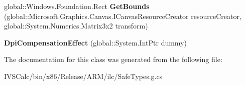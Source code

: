 \begin{DoxyCompactItemize}
\item 
\mbox{\label{class_microsoft_1_1_graphics_1_1_canvas_1_1_effects_1_1_dpi_compensation_effect_affcc94a3d3762f96011af355812faf07}} 
global\+::\+Windows.\+Foundation.\+Rect {\bfseries Get\+Bounds} (global\+::\+Microsoft.\+Graphics.\+Canvas.\+I\+Canvas\+Resource\+Creator resource\+Creator, global\+::\+System.\+Numerics.\+Matrix3x2 transform)
\item 
\mbox{\label{class_microsoft_1_1_graphics_1_1_canvas_1_1_effects_1_1_dpi_compensation_effect_a54141aa5d933a8cdc483ca29381329b9}} 
{\bfseries Dpi\+Compensation\+Effect} (global\+::\+System.\+Int\+Ptr dummy)
\end{DoxyCompactItemize}


The documentation for this class was generated from the following file\+:\begin{DoxyCompactItemize}
\item 
I\+V\+S\+Calc/bin/x86/\+Release/\+A\+R\+M/ilc/Safe\+Types.\+g.\+cs\end{DoxyCompactItemize}
